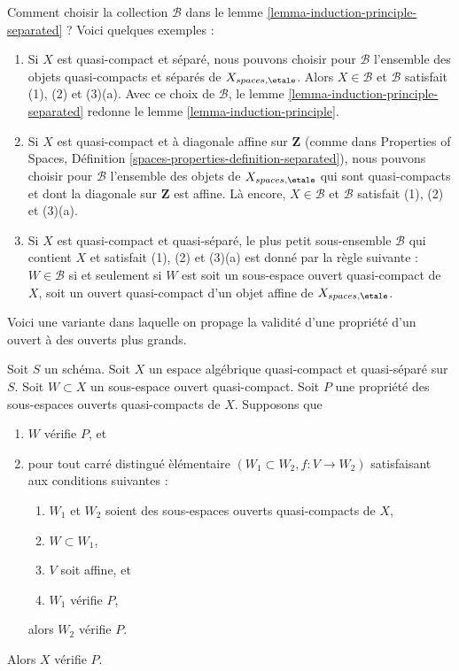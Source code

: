 \begin{remark}
\label{remark-how-to}
Comment choisir la collection $\mathcal{B}$ dans le
lemme \ref{lemma-induction-principle-separated} ?
Voici quelques exemples :
\begin{enumerate}
\item Si $X$ est quasi-compact et séparé, nous pouvons choisir pour
$\mathcal{B}$ l'ensemble des objets quasi-compacts et séparés
de $X_{spaces, \etale}$. Alors $X \in \mathcal{B}$ et $\mathcal{B}$
satisfait (1), (2) et (3)(a). Avec ce choix de $\mathcal{B}$, le
lemme \ref{lemma-induction-principle-separated} redonne le
lemme \ref{lemma-induction-principle}.
\item Si $X$ est quasi-compact et à diagonale affine
sur $\mathbf{Z}$ (comme dans Properties of Spaces, Définition
\ref{spaces-properties-definition-separated}), nous pouvons choisir pour
$\mathcal{B}$ l'ensemble des objets de $X_{spaces, \etale}$ qui sont
quasi-compacts et dont la diagonale sur $\mathbf{Z}$ est affine. Là encore,
$X \in \mathcal{B}$ et $\mathcal{B}$ satisfait (1), (2) et (3)(a).
\item Si $X$ est quasi-compact et quasi-séparé, le plus petit sous-ensemble
$\mathcal{B}$ qui contient $X$ et satisfait (1), (2) et (3)(a) est donné par
la règle suivante : $W \in \mathcal{B}$ si et seulement si $W$ est soit un
sous-espace ouvert quasi-compact de $X$, soit un ouvert quasi-compact d'un
objet affine de $X_{spaces, \etale}$.
\end{enumerate}
\end{remark}

\noindent
Voici une variante dans laquelle on propage la validit\'e d'une propri\'et\'e
d'un ouvert \`a des ouverts plus grands.

\begin{lemma}
\label{lemma-induction-principle-enlarge}
Soit $S$ un sch\'ema. Soit $X$ un espace alg\'ebrique quasi-compact et
quasi-s\'epar\'e sur $S$. Soit $W \subset X$ un sous-espace ouvert
quasi-compact. Soit $P$ une propri\'et\'e des sous-espaces ouverts
quasi-compacts de $X$. Supposons que
\begin{enumerate}
\item $W$ v\'erifie $P$, et
\item pour tout carr\'e distingu\'e \`el\'ementaire
$(W_1 \subset W_2, f : V \to W_2)$ satisfaisant aux conditions suivantes :
\begin{enumerate}
\item $W_1$ et $W_2$ soient des sous-espaces ouverts quasi-compacts de $X$,
\item $W \subset W_1$,
\item $V$ soit affine, et
\item $W_1$ v\'erifie $P$,
\end{enumerate}
alors $W_2$ v\'erifie $P$.
\end{enumerate}
Alors $X$ v\'erifie $P$.
\end{lemma}

